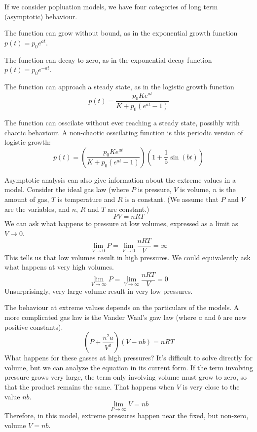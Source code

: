\documentclass[fleqn]{report}
\begin{document}
If we consider popluation models, we have four categories of
long term (asymptotic) behaviour. 
\begin{smallitemize}
\item The function can grow without bound, as in the
exponential growth function $p(t) = p_0 e^{at}$.
\item The function can decay to zero, as in the exponential
decay function $p(t) = p_0 e^{-at}$.
\item The function can approach a steady state, as in the
logistic growth function 
\begin{equation*}
p(t) = \frac{p_0 K e^{at}}{K + p_0 (e^{at}-1)}
\end{equation*}
\item The function can osscilate without ever reaching a
steady state, possibly with chaotic behaviour. A non-chaotic
osscilating function is this periodic version of logistic
growth:
\begin{equation*}
p(t) = \left(\frac{p_0 K e^{at}}{K + p_0 (e^{at}-1)} \right)
\left( 1 + \frac{1}{5} \sin (bt) \right) 
\end{equation*}
\end{smallitemize}

Asymptotic analysis can also give information about the
extreme values in a model. Consider the ideal gas law (where
$P$ is pressure, $V$ is volume, $n$ is the amount of gas, $T$
is temperature and $R$ is a constant. (We assume that $P$ and
$V$ are the variables, and $n$, $R$ and $T$ are constant.)
\begin{equation*}
PV = nRT
\end{equation*}
We can ask what happens to pressure at low volumes, expressed
as a limit as $V \rightarrow 0$.
\begin{equation*}
\lim_{V \rightarrow 0} P = \lim_{V \rightarrow 0}
\frac{nRT}{V} = \infty
\end{equation*}
This tells us that low volumes result in high pressures.
We could equivalently ask what happens at very high
volumes.
\begin{equation*}
\lim_{V \rightarrow \infty} P = \lim_{V \rightarrow \infty}
\frac{nRT}{V} = 0
\end{equation*}
Unsurprisingly, very large volume result in very low
pressures.

The behaviour at extreme values depends on the particulars of
the models. A more complicated gas law is the Vander Waal's
gaw law (where $a$ and $b$ are new positive constants).
\begin{equation*}
\left( P + \frac{n^2 a}{V^2} \right) \left( V - nb \right) =
nRT
\end{equation*}
What happens for these gasses at high pressures? It's
difficult to solve directly for volume, but we can analyze the
equation in its current form. If the term involving pressure
grows very large, the term only involving volume must grow to
zero, so that the product remains the same. That happens when
$V$ is very close to the value $nb$.
\begin{equation*}
\lim_{P \rightarrow \infty} V = nb
\end{equation*}
Therefore, in this model, extreme pressures happen near the
fixed, but non-zero, volume $V = nb$.
\end{document}
